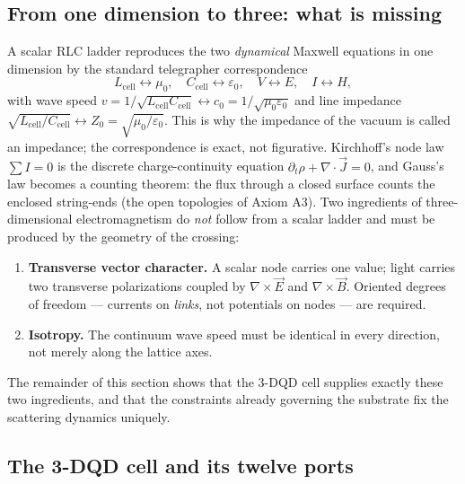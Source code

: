 \documentclass[11pt,a4paper]{article}
\theoremstyle{plain}
\theoremstyle{remark}
\begin{document}
\subsection{From one dimension to three: what is missing}
\label{maxwell3d:missing}

A scalar RLC ladder reproduces the two \emph{dynamical} Maxwell equations in one dimension by the standard telegrapher correspondence
\begin{equation}\label{maxwell3d:telegraph}
L_{\text{cell}} \leftrightarrow \mu_0, \quad C_{\text{cell}} \leftrightarrow \varepsilon_0, \quad V \leftrightarrow E, \quad I \leftrightarrow H,
\end{equation}
with wave speed $v = 1/\sqrt{L_{\text{cell}}C_{\text{cell}}} \leftrightarrow c_0 = 1/\sqrt{\mu_0\varepsilon_0}$ and line impedance $\sqrt{L_{\text{cell}}/C_{\text{cell}}} \leftrightarrow Z_0 = \sqrt{\mu_0/\varepsilon_0}$. This is why the impedance of the vacuum is called an impedance; the correspondence is exact, not figurative. Kirchhoff's node law $\sum I = 0$ is the discrete charge-continuity equation $\partial_t\rho + \nabla\!\cdot\!\vec{J} = 0$, and Gauss's law becomes a counting theorem: the flux through a closed surface counts the enclosed string-ends (the open topologies of Axiom A3). Two ingredients of three-dimensional electromagnetism do \emph{not} follow from a scalar ladder and must be produced by the geometry of the crossing:
\begin{enumerate}[leftmargin=2em,itemsep=1pt]
\item \textbf{Transverse vector character.} A scalar node carries one value; light carries two transverse polarizations coupled by $\nabla\times\vec{E}$ and $\nabla\times\vec{B}$. Oriented degrees of freedom --- currents on \emph{links}, not potentials on nodes --- are required.
\item \textbf{Isotropy.} The continuum wave speed must be identical in every direction, not merely along the lattice axes.
\end{enumerate}
The remainder of this section shows that the 3-DQD cell supplies exactly these two ingredients, and that the constraints already governing the substrate fix the scattering dynamics uniquely.

\subsection{The 3-DQD cell and its twelve ports}
\label{maxwell3d:cell}
\end{document}
